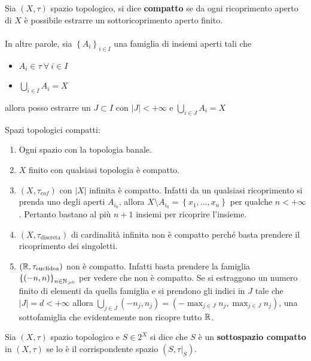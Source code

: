 \begin{definition}
	Sia $(X, \tau)$ spazio topologico, si dice \textbf{compatto} se da ogni ricoprimento aperto di $X$ è possibile estrarre un sottoricoprimento aperto finito. \\ \\ In altre parole, sia $\left\{A_i\right\}_{i\in I}$ una famiglia di insiemi aperti tali che
	\begin{itemize}
		\item $A_i \in \tau \ \forall \ i\in I$
		\item $\bigcup_{i \in I} A_i = X$
	\end{itemize}
	allora posso estrarre un $J \subset I$ con $|J| < +\infty$ e $\bigcup_{i \in J} A_i = X$
\end{definition} 

\begin{example} Spazi topologici compatti:
\begin{enumerate}
	\item Ogni spazio con la topologia banale.
	\item $X$ finito con qualsiasi topologia è compatto.
	\item $(X, \tau_{cof})$ con $|X|$ infinita è compatto. Infatti da un qualsiasi ricoprimento si prenda uno degli aperti $A_{i_0}$, allora $X \setminus A_{i_0} = \left\{x_1, \dots, x_n\right\}$ per qualche $n < +\infty$. Pertanto bastano al più $n+1$ insiemi per ricoprire l'insieme.
	\item $(X,\tau_{\text{discreta}})$ di cardinalità infinita non è compatto perché basta prendere il ricoprimento dei singoletti.
	\item $(\mathbb{R}, \tau_{\text{euclidea}})$ non è compatto. Infatti basta prendere la famiglia $\left\{(-n, n)\right\}_{n \in \mathbb{N}_{>0}}$ per vedere che non è compatto. Se si estraggono un numero finito di elementi da quella famiglia e si prendono gli indici in $J$ tale che $|J| = d < +\infty$ allora $\bigcup_{j \in J}(-n_j, n_j) = (-\max_{j \in J} n_j,  \max_{j \in J} n_j)$, una sottofamiglia che evidentemente non ricopre tutto $\mathbb{R}$.
\end{enumerate}
\end{example}

\begin{definition}
	Sia $(X, \tau)$ spazio topologico e $S \in 2^X$ si dice che $S$ è un \textbf{sottospazio compatto} in $(X, \tau)$ se lo è il corrispondente spazio $(S, \tau|_S)$.
\end{definition} 

